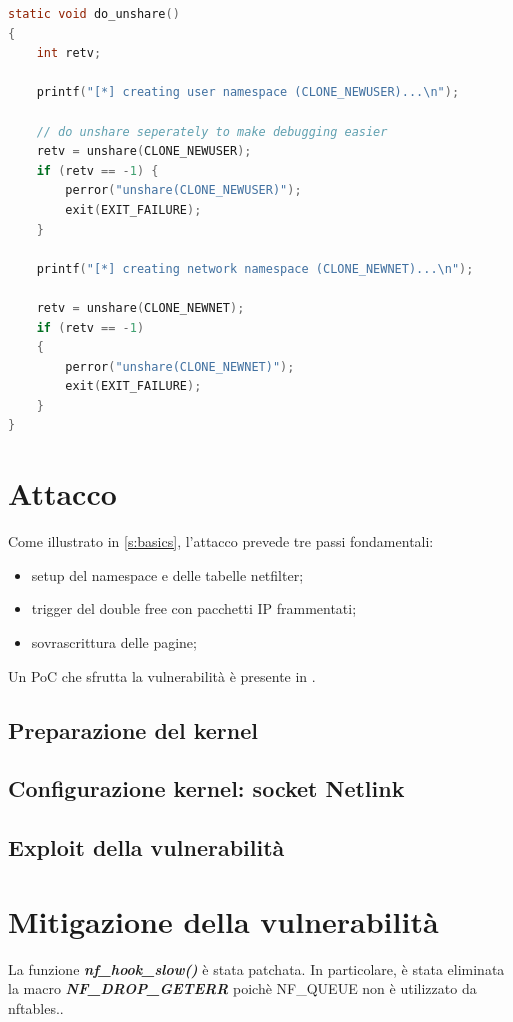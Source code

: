 \documentclass{article}
\begin{document}
\begin{lstlisting}[language=C,style=CStyle,caption="Setup network namespace come utente non privilegiato"]
static void do_unshare()
{
    int retv;

    printf("[*] creating user namespace (CLONE_NEWUSER)...\n");
    
	// do unshare seperately to make debugging easier
    retv = unshare(CLONE_NEWUSER);
	if (retv == -1) {
        perror("unshare(CLONE_NEWUSER)");
        exit(EXIT_FAILURE);
    }

    printf("[*] creating network namespace (CLONE_NEWNET)...\n");

    retv = unshare(CLONE_NEWNET);
    if (retv == -1)
	{
		perror("unshare(CLONE_NEWNET)");
		exit(EXIT_FAILURE);
	}
}
\end{lstlisting}

\clearpage
\section{Attacco}
Come illustrato in \cref{s:basics}, l'attacco prevede tre 
passi fondamentali:
\begin{itemize}
  \item setup del namespace e delle tabelle netfilter;
  \item trigger del double free con pacchetti IP frammentati;
  \item sovrascrittura delle pagine;
\end{itemize}
Un PoC che sfrutta la vulnerabilità è presente in \cite{ExploitPoC}.
\subsection{Preparazione del kernel}

\subsection{Configurazione kernel: socket Netlink}

\subsection{Exploit della vulnerabilità}

\clearpage

\section{Mitigazione della vulnerabilità}
La funzione \textbf{\textit{nf\_hook\_slow()}} è stata patchata. In particolare, è stata 
eliminata la macro \textbf{\textit{NF\_DROP\_GETERR}} poichè NF\_QUEUE non è utilizzato da 
nftables.\cite{Patch}.
\end{document}

